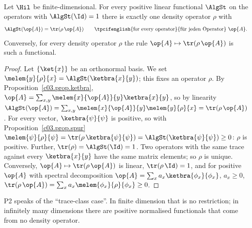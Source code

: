 
\begin{proposition}\label{c04.prop.funktionale}
  Let $\Hil$ be finite-dimensional. For every positive linear functional $\AlgSt$ on the operators
  with $\AlgSt(\Id) = 1$ there is exactly one density operator $\rho$ with
  \begin{equation}\label{c04.eq.funktional}
    \AlgSt(\op{A}) = \tr(\rho\, \op{A}) \qquad \text{\tpcifenglish{for every operator}{für jeden Operator}}\ \op{A} .
  \end{equation}
  Conversely, for every density operator $\rho$ the rule $\op{A} \mapsto \tr(\rho\,\op{A})$ is
  such a functional.
\end{proposition}
\begin{proof}
  Let $\{\ket{x}\}$ be an orthonormal basis. We set $\melem{y}{\rho}{x} = \AlgSt(\ketbra{x}{y})$;
  this fixes an operator $\rho$. By Proposition~\ref{c03.prop.ketbra},
  $\op{A} = \sum_{x,y} \melem{x}{\op{A}}{y} \ketbra{x}{y}$, so by linearity
  $\AlgSt(\op{A}) = \sum_{x,y} \melem{x}{\op{A}}{y}\melem{y}{\rho}{x} = \tr(\rho\,\op{A})$. For every
  vector, $\ketbra{\psi}{\psi}$ is positive, so with Proposition~\ref{c03.prop.spur}
  $\melem{\psi}{\rho}{\psi} = \tr(\rho\,\ketbra{\psi}{\psi}) = \AlgSt(\ketbra{\psi}{\psi}) \geq 0$:
  $\rho$ is positive. Further, $\tr(\rho) = \AlgSt(\Id) = 1$. Two operators with the same trace
  against every $\ketbra{x}{y}$ have the same matrix elements; so $\rho$ is unique. Conversely,
  $\op{A} \mapsto \tr(\rho\,\op{A})$ is linear, $\tr(\rho\,\Id) = 1$, and for positive $\op{A}$
  with spectral decomposition $\op{A} = \sum_x a_x \ketbra{\phi_x}{\phi_x}$, $a_x \geq 0$,
  $\tr(\rho\,\op{A}) = \sum_x a_x \melem{\phi_x}{\rho}{\phi_x} \geq 0$.
\end{proof}

P2 speaks of the ``trace-class case''. In finite dimension that is no restriction; in infinitely
many dimensions there are positive normalised functionals that come from no density
operator.

